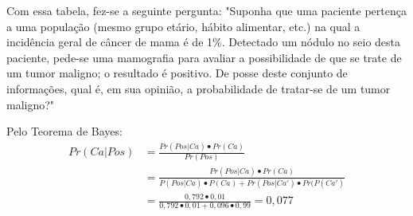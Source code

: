 \documentclass[lnbip]{svmultln}
\begin{document}
Com essa tabela, fez-se a seguinte pergunta: "Suponha que uma paciente pertença a uma população (mesmo grupo etário, hábito alimentar, etc.) na qual a incidência geral de câncer de mama é de 1\%. Detectado um nódulo no seio desta paciente, pede-se uma mamografia para avaliar a possibilidade de que se trate de um tumor maligno; o resultado é positivo. De posse deste conjunto de informações, qual é, em sua opinião, a probabilidade de tratar-se de um tumor maligno?"

Pelo Teorema de Bayes:
\begin{equation}
\begin{split}
Pr(Ca|Pos) & = \frac{Pr(Pos|Ca) \bullet Pr(Ca)}{Pr(Pos)} \\
& = \frac{Pr(Pos|Ca) \bullet Pr(Ca)}{P(Pos|Ca) \bullet P(Ca) + Pr(Pos|Ca') \bullet Pr(P(Ca')} \\
& = \frac{0,792 \bullet 0,01}{0,792 \bullet 0,01 + 0,096 \bullet 0,99} = 0,077
\end{split}
\end{equation}
\end{document}
